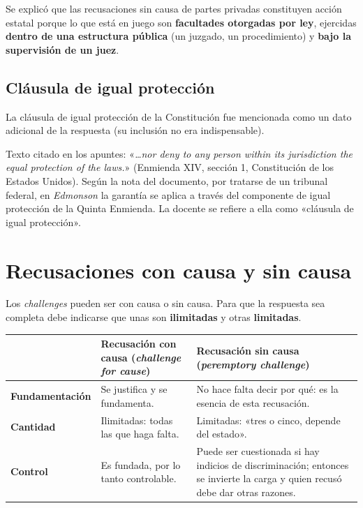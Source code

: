 \documentclass[12pt,oneside]{book}
\begin{document}
Se explicó que las recusaciones sin causa de partes privadas constituyen acción estatal porque lo que está en juego son \textbf{facultades otorgadas por ley}, ejercidas \textbf{dentro de una estructura pública} (un juzgado, un procedimiento) y \textbf{bajo la supervisión de un juez}.

\subsection{Cláusula de igual protección}

La cláusula de igual protección de la Constitución fue mencionada como un dato adicional de la respuesta (su inclusión no era indispensable).

\begin{note}
Texto citado en los apuntes: «\textit{\ldots nor deny to any person within its jurisdiction the equal protection of the laws.}» (Enmienda XIV, sección 1, Constitución de los Estados Unidos). Según la nota del documento, por tratarse de un tribunal federal, en \textit{Edmonson} la garantía se aplica a través del componente de igual protección de la Quinta Enmienda. La docente se refiere a ella como «cláusula de igual protección».
\end{note}

\section{Recusaciones con causa y sin causa}

Los \textit{challenges} pueden ser con causa o sin causa. Para que la respuesta sea completa debe indicarse que unas son \textbf{ilimitadas} y otras \textbf{limitadas}.

\begin{table}[H]
\centering
\renewcommand{\arraystretch}{1.3}
\begin{tabularx}{\textwidth}{
    >{\raggedright\arraybackslash}p{}
    >{\raggedright\arraybackslash}X
    >{\raggedright\arraybackslash}X
}
\toprule
 & \textbf{Recusación con causa} (\textit{challenge for cause}) & \textbf{Recusación sin causa} (\textit{peremptory challenge}) \\
\midrule
\textbf{Fundamentación} & Se justifica y se fundamenta. & No hace falta decir por qué: es la esencia de esta recusación. \\
\textbf{Cantidad} & Ilimitadas: todas las que haga falta. & Limitadas: «tres o cinco, depende del estado». \\
\textbf{Control} & Es fundada, por lo tanto controlable. & Puede ser cuestionada si hay indicios de discriminación; entonces se invierte la carga y quien recusó debe dar otras razones. \\
\bottomrule
\end{tabularx}
\end{table}
\end{document}
